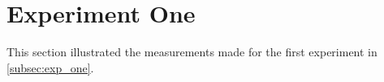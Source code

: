 \section{Experiment One}\label{app:exp_one}

This section illustrated the measurements made for the first experiment in \cref{subsec:exp_one}.

% 
% 
% 

% 


% 

